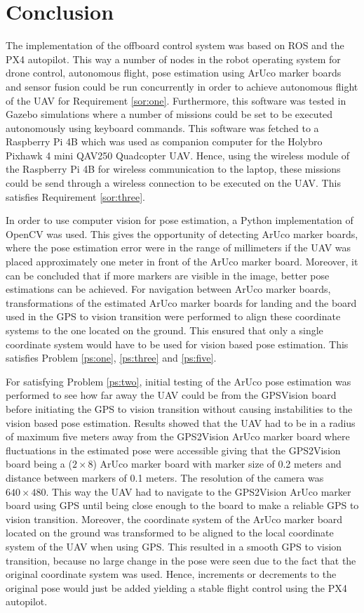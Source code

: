 \documentclass[../Head/report.tex]{subfiles}
\begin{document}
\section{Conclusion}

The implementation of the offboard control system was based on ROS and the PX4 autopilot. This way a number of nodes in the robot operating system for drone control, autonomous flight, pose estimation using ArUco marker boards and sensor fusion could be run concurrently in order to achieve autonomous flight of the UAV for Requirement \ref{sor:one}. Furthermore, this software was tested in Gazebo simulations where a number of missions could be set to be executed autonomously using keyboard commands. This software was fetched to a Raspberry Pi 4B which was used as companion computer for the Holybro Pixhawk 4 mini QAV250 Quadcopter UAV. Hence, using the wireless module of the Raspberry Pi 4B for wireless communication to the laptop, these missions could be send through a wireless connection to be executed on the UAV. This satisfies Requirement \ref{sor:three}.     

In order to use computer vision for pose estimation, a Python implementation of OpenCV was used. This gives the opportunity of detecting ArUco marker boards, where the pose estimation error were in the range of millimeters if the UAV was placed approximately one meter in front of the ArUco marker board. Moreover, it can be concluded that if more markers are visible in the image, better pose estimations can be achieved. For navigation between ArUco marker boards, transformations of the estimated ArUco marker boards for landing and the board used in the GPS to vision transition were performed to align these coordinate systems to the one located on the ground. This ensured that only a single coordinate system would have to be used for vision based pose estimation. This satisfies Problem \ref{ps:one}, \ref{ps:three} and \ref{ps:five}.

For satisfying Problem \ref{ps:two}, initial testing of the ArUco pose estimation was performed to see how far away the UAV could be from the GPSVision board before initiating the GPS to vision transition without causing instabilities to the vision based pose estimation. Results showed that the UAV had to be in a radius of maximum five meters away from the GPS2Vision ArUco marker board where fluctuations in the estimated pose were accessible giving that the GPS2Vision board being a ($2 \times 8 $) ArUco marker board with marker size of 0.2 meters and distance between markers of 0.1 meters. The resolution of the camera was $640 \times 480$. This way the UAV had to navigate to the GPS2Vision ArUco marker board using GPS until being close enough to the board to make a reliable GPS to vision transition. Moreover, the coordinate system of the ArUco marker board located on the ground was transformed to be aligned to the local coordinate system of the UAV when using GPS. This resulted in a smooth GPS to vision transition, because no large change in the pose were seen due to the fact that the original coordinate system was used. Hence, increments or decrements to the original pose would just be added yielding a stable   flight control using the PX4 autopilot.
\end{document}

